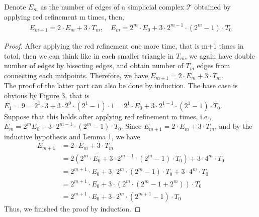     \begin{lemma}
    Denote $E_{m}$ as the number of edges of a simplicial complex $\mathcal{T}$ obtained by applying red refinement m times, then,
    \begin{align*}
    E_{m+1} = 2 \cdot E_m + 3 \cdot T_m, \quad E_{m} = 2^{m}\cdot E_0 + 3 \cdot2^{m-1}\cdot(2^{m} -1)\cdot T_0
    \end{align*}
    \end{lemma}
    \begin{proof}
    After applying the red refinement one more time, that is m+1 times in total, then we can think like in each smaller triangle in $T_m$, we again have double number of edges by bisecting edges, and obtain number of $T_m$ edges from connecting each midpoints. Therefore, we have $E_{m+1} = 2\cdot E_m + 3\cdot T_m$.\\
    The proof of the latter part can also be done by induction. The base case is obvious by Figure 3, that is $E_1 = 9 = 2^1\cdot 3 + 3\cdot 2^0 \cdot (2^1 - 1)\cdot1 = 2^1\cdot E_0 + 3\cdot2^{1-1}\cdot(2^1 - 1)\cdot T_0$.\\
    Suppose that this holds after applying red refinement m times, i.e., $E_{m} = 2^{m} E_0 + 3 \cdot2^{m-1}\cdot(2^{m} -1)\cdot T_0$. Since $E_{m+1} = 2 \cdot E_m + 3 \cdot T_m$, and by the inductive hypothesis and Lemma 1, we have
    \begin{align*}
    E_{m+1} &= 2 \cdot E_m + 3 \cdot T_m \\
    &= 2(2^{m}\cdot E_0 + 3 \cdot2^{m-1}\cdot(2^{m} -1)\cdot T_0) + 3\cdot 4^m\cdot T_0\\
    &= 2^{m+1}\cdot E_0 + 3\cdot2^m\cdot(2^m - 1)\cdot T_0 + 3\cdot4^m\cdot T_0\\
    &= 2^{m+1}\cdot E_0 + 3\cdot(2^m\cdot(2^m -1 + 2^m))\cdot T_0\\
    &=2^{m+1}\cdot E_0 + 3\cdot2^m\cdot(2^{m+1}-1)\cdot T_0
    \end{align*}
    Thus, we finished the proof by induction.
    \end{proof}

